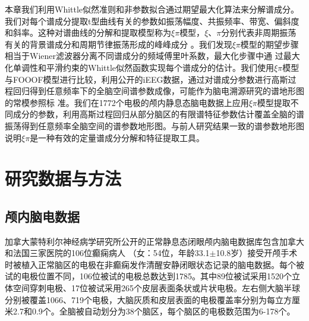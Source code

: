 本章我们利用Whittle似然准则和非参数拟合通过期望最大化算法来分解谱成分。我们对每个谱成分提取t型曲线有关的参数如振荡幅度、共振频率、带宽、偏斜度和斜率。这种对谱曲线的分解和提取模型称为$\xi\pi$模型，$\xi$、$\pi$分别代表非周期振荡有关的背景谱成分和周期节律振荡形成的峰峰成分
。我们发现$\xi\pi$模型的期望步骤相当于Wiener滤波器分离不同谱成分的频域傅里叶系数，最大化步骤中通
过最大化单调性和平滑约束的Whittle似然函数实现每个谱成分的估计。我们使用$\xi\pi$模型与FOOOF模型进行比较，利用公开的iEEG数据，通过对谱成分参数进行高斯过程回归得到任意频率下的全脑空间谱参数成像，可能作为脑电溯源研究的谱地形图的常模参照标
准。我们在1772个电极的颅内静息态脑电数据上应用$\xi\pi$模型提取不同成分的参数，利用高斯过程回归从部分脑区的有限谱特征参数估计覆盖全脑的谱振荡得到任意频率全脑空间的谱参数地形图。与前人研究结果一致的谱参数地形图说明$\xi\pi$是一种有效的定量谱成分分解和特征提取工具。

\section{研究数据与方法}
\subsection{颅内脑电数据}
加拿大蒙特利尔神经病学研究所公开的正常静息态闭眼颅内脑电数据库包含加拿大和法国三家医院的106位癫痫病人
（女：54位，年龄33.1$\pm$10.8岁）接受开颅手术时被植入正常脑区的电极在非癫痫发作清醒安静闭眼状态记录的脑电数据。每个被试的电极位置不同，106位被试的电极总数达到1785。其中89位被试采用1520个立体空间穿刺电极、17位被试采用265个皮层表面条状或片状电极。左右侧大脑半球分别被覆盖1066、719个电极，大脑灰质和皮层表面的电极覆盖率分别为每立方厘米2.7和0.9个。全脑被自动划分为38个脑区，每个脑区的电极数范围为6-178个。

